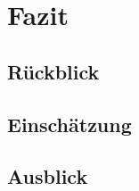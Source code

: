 \clearpage

\section{Fazit}
\label{sec:fazit}



\subsection{Rückblick}
\label{subsec:ruckblick}

\subsection{Einschätzung}
\label{subsec:einschatzung}

\subsection{Ausblick}
\label{subsec:ausblick}


%

